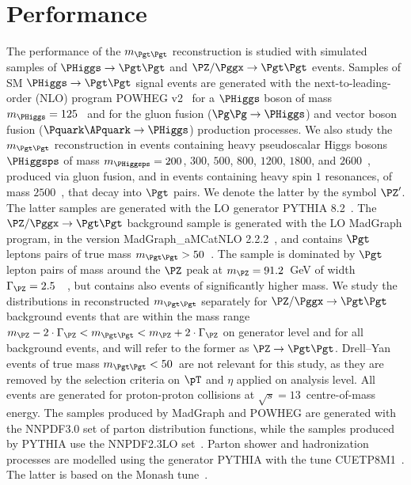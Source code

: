 \section{Performance}
\label{sec:performance}

The performance of the $m_{\Pgt\Pgt}$ reconstruction is studied with
simulated samples of $\PHiggs \to \Pgt\Pgt$ and $\PZ/\Pggx \to \Pgt\Pgt$ events.
Samples of SM $\PHiggs \to \Pgt\Pgt$ signal events
are generated with the next-to-leading-order (NLO) program POWHEG v2~\cite{POWHEG1,POWHEG2,POWHEG3}
for a $\PHiggs$ boson of mass $m_{\PHiggs} = 125$~\GeV 
and for the gluon fusion ($\Pg\Pg \to \PHiggs$) and vector boson fusion ($\Pquark\APquark \to \PHiggs$) production processes.
We also study the $m_{\Pgt\Pgt}$ reconstruction in events containing
heavy pseudoscalar Higgs bosons $\PHiggsps$ of mass $m_{\PHiggsps} = 200$, $300$, $500$, $800$, $1200$, $1800$, and $2600$~\GeV,
produced via gluon fusion, and in events containing heavy spin $1$
resonances, of mass $2500$~\GeV, that decay into $\Pgt$ pairs.
We denote the latter by the symbol $\PZ'$. 
The latter samples are generated with the LO generator PYTHIA 8.2~\cite{pythia8}.
The $\PZ/\Pggx \to \Pgt\Pgt$ background sample is generated with the LO MadGraph program, in the version MadGraph\_aMCatNLO 2.2.2~\cite{MadGraph_aMCatNLO},
and contains $\Pgt$ leptons pairs of true mass $m_{\Pgt\Pgt} > 50$~\GeV.
The sample is dominated by $\Pgt$ lepton pairs of mass around the $\PZ$ peak at $m_{\PZ} = 91.2$~GeV of width $\Gamma_{\PZ} = 2.5$~\GeV~\cite{PDG}, 
but contains also events of significantly higher mass.
We study the distributions in reconstructed $m_{\Pgt\Pgt}$ separately for 
$\PZ/\Pggx \to \Pgt\Pgt$ background events that are within the mass range $m_{\PZ} - 2 \cdot \Gamma_{\PZ} < m_{\Pgt\Pgt} < m_{\PZ} + 2 \cdot \Gamma_{\PZ}$ on generator level
and for all background events,
and will refer to the former as $\PZ \to \Pgt\Pgt$.
Drell--Yan events of true mass $m_{\Pgt\Pgt} < 50$~\GeV are not relevant for this study, 
as they are removed by the selection criteria on $\pT$ and $\eta$ applied on analysis level.
All events are generated for proton-proton collisions at $\sqrt{s} = 13$~\TeV centre-of-mass energy.
The samples produced by MadGraph and POWHEG are generated with the NNPDF3.0 set of parton distribution functions,
while the samples produced by PYTHIA use the NNPDF2.3LO set~\cite{NNPDF1,NNPDF2,NNPDF3}.
Parton shower and hadronization processes are modelled using the generator PYTHIA with the tune CUETP8M1~\cite{PYTHIA_CUETP8M1tune_CMS}.
The latter is based on the Monash tune~\cite{PYTHIA_MonashTune}.
